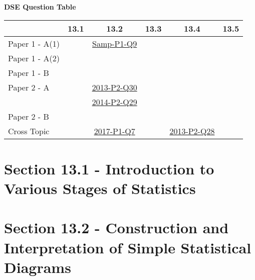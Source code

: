 \documentclass[12pt, a4paper]{article}
\begin{document}
\begin{absolutelynopagebreak}
\begin{center}
\textbf{DSE Question Table}
\end{center}
\begin{center}
\begin{tabular}{|l|c|c|c|c|c|}
\hline
        & 13.1 & 13.2 & 13.3 & 13.4 & 13.5 \\\hline
\hline
Paper 1 - A(1)&  & \hyperref[DSE2012S-CoreP1-Q09]{Samp-P1-Q9} &  &  &  \\
\hline
Paper 1 - A(2)&  &  &  &  &  \\
\hline
Paper 1 - B&  &  &  &  &  \\
\hline
\hline
Paper 2 - A&  & \hyperref[DSE2013-CoreP2-Q30]{2013-P2-Q30} &  &  &  \\
&  & \hyperref[DSE2014-CoreP2-Q29]{2014-P2-Q29} &  &  &  \\
\hline
Paper 2 - B&  &  &  &  &  \\
\hline
\hline
Cross Topic&  & \hyperref[DSE2017-CoreP1-Q07]{2017-P1-Q7} &  & \hyperref[DSE2013-CoreP2-Q28]{2013-P2-Q28} &  \\
\hline
\end{tabular}
\end{center}
\end{absolutelynopagebreak}




\section*{Section 13.1 - Introduction to Various Stages of Statistics}\label{section:1-13-1}





\section*{Section 13.2 - Construction and Interpretation of Simple Statistical Diagrams}\label{section:1-13-2}
\end{document}
